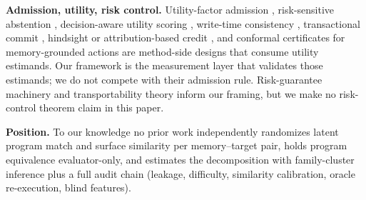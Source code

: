 \textbf{Admission, utility, risk control.}
Utility-factor admission \citep{amac2026}, risk-sensitive abstention \citep{rscbmc2026}, decision-aware utility scoring \citep{damc2026}, write-time consistency \citep{consistencygate2026}, transactional commit \citep{memtx2026}, hindsight or attribution-based credit \citep{himpo2026,attrimem2026}, and conformal certificates for memory-grounded actions \citep{safecommit2026} are method-side designs that consume utility estimands. Our framework is the measurement layer that validates those estimands; we do not compete with their admission rule. Risk-guarantee machinery \citep{angelopoulos2024crc,wu2016conservative} and transportability theory \citep{jalaldoust2024transport} inform our framing, but we make no risk-control theorem claim in this paper.

\textbf{Position.} To our knowledge no prior work independently randomizes latent program match and surface similarity per memory--target pair, holds program equivalence evaluator-only, and estimates the decomposition with family-cluster inference plus a full audit chain (leakage, difficulty, similarity calibration, oracle re-execution, blind features).
